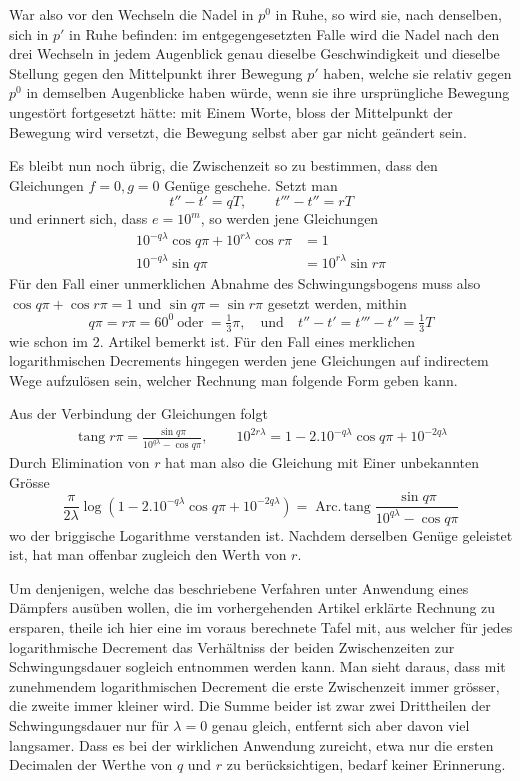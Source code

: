 War also vor den Wechseln die Nadel in $p^0$ in Ruhe, so wird sie, nach denselben, sich in $p'$ in Ruhe befinden: im entgegengesetzten Falle wird die Nadel nach den drei Wechseln in jedem Augenblick genau dieselbe Geschwindigkeit und dieselbe Stellung gegen den Mittelpunkt ihrer Bewegung $p'$ haben, welche sie relativ gegen $p^0$ in demselben Augenblicke haben würde, wenn sie ihre ursprüngliche Bewegung ungestört fortgesetzt hätte: mit Einem Worte, bloss der Mittelpunkt der Bewegung wird versetzt, die Bewegung selbst aber gar nicht geändert sein.

Es bleibt nun noch übrig, die Zwischenzeit so zu bestimmen, dass den Gleichungen $f=0,g=0$ Genüge geschehe. Setzt man
\[
t''-t'=qT,\qquad t'''-t''=rT
\]
und erinnert sich, dass $e=10^m$, so werden jene Gleichungen
\[
\begin{aligned}
10^{-q\lambda}\cos q\pi+10^{r\lambda}\cos r\pi&=1\\
10^{-q\lambda}\sin q\pi&=10^{r\lambda}\sin r\pi
\end{aligned}
\]
Für den Fall einer unmerklichen Abnahme des Schwingungsbogens muss also $\cos q\pi+\cos r\pi=1$ und $\sin q\pi=\sin r\pi$ gesetzt werden, mithin
\[
q\pi=r\pi=60^0\ \text{oder}\ =\tfrac{1}{3}\pi,\quad\text{und}\quad t''-t'=t'''-t''=\tfrac{1}{3}T
\]
wie schon im 2. Artikel bemerkt ist. Für den Fall eines merklichen logarithmischen Decrements hingegen werden jene Gleichungen auf indirectem Wege aufzulösen sein, welcher Rechnung man folgende Form geben kann.

Aus der Verbindung der Gleichungen folgt
\[
\begin{gathered}
\operatorname{tang}r\pi=\frac{\sin q\pi}{10^{q\lambda}-\cos q\pi},\qquad
10^{2r\lambda}=1-2.10^{-q\lambda}\cos q\pi+10^{-2q\lambda}
\end{gathered}
\]
Durch Elimination von $r$ hat man also die Gleichung mit Einer unbekannten Grösse
\[
\frac{\pi}{2\lambda}\log(1-2.10^{-q\lambda}\cos q\pi+10^{-2q\lambda})=\operatorname{Arc.\,tang}\frac{\sin q\pi}{10^{q\lambda}-\cos q\pi}
\]
wo der briggische Logarithme verstanden ist. Nachdem derselben Genüge geleistet ist, hat man offenbar zugleich den Werth von $r$.

Um denjenigen, welche das beschriebene Verfahren unter Anwendung eines Dämpfers ausüben wollen, die im vorhergehenden Artikel erklärte Rechnung zu ersparen, theile ich hier eine im voraus berechnete Tafel mit, aus welcher für jedes logarithmische Decrement das Verhältniss der beiden Zwischenzeiten zur Schwingungsdauer sogleich entnommen werden kann. Man sieht daraus, dass mit zunehmendem logarithmischen Decrement die erste Zwischenzeit immer grösser, die zweite immer kleiner wird. Die Summe beider ist zwar zwei Drittheilen der Schwingungsdauer nur für $\lambda=0$ genau gleich, entfernt sich aber davon viel langsamer. Dass es bei der wirklichen Anwendung zureicht, etwa nur die ersten Decimalen der Werthe von $q$ und $r$ zu berücksichtigen, bedarf keiner Erinnerung.

